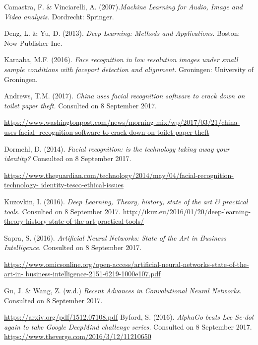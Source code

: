 \documentclass[12pt, titlepage]{article}
\begin{document}
		\begin{thebibliography}{99}
			Camastra, F. \& Vinciarelli, A. (2007).\textit{Machine Learning for Audio, Image and Video 				analysis.} Dordrecht: Springer.
			
			Deng, L. \& Yu, D. (2013). \textit{Deep Learning: Methods and Applications.} Boston: Now 				Publisher Inc.
			
			Karaaba, M.F. (2016). \textit{Face recognition in low resolution images under small sample 				conditions with facepart detection and alignment.} Groningen: University of Groningen.
			
			Andrews, T.M. (2017). \textit{China uses facial recognition software to crack down on toilet 			paper theft.} Consulted on 8 September 2017.
			
			\url{https://www.washingtonpost.com/news/morning-mix/wp/2017/03/21/china-uses-facial-					recognition-software-to-crack-down-on-toilet-paper-theft}
			
			Dormehl, D. (2014). \textit{Facial recognition: is the technology taking away your identity?} 			Consulted on 8 September 2017.
			
			\url{https://www.theguardian.com/technology/2014/may/04/facial-recognition-technology-					identity-tesco-ethical-issues}
			
			Kuzovkin, I. (2016). \textit{Deep Learning, Theory, history, state of the art \& practical 				tools.} Consulted on 8 September 2017.
			\url{http://ikuz.eu/2016/01/20/deep-learning-theory-history-state-of-the-art-practical-tools/}
			
			
			Sapra, S. (2016). \textit{Artificial Neural Networks: State of the Art in Business 						Intelligence.} Consulted on 8 September 2017.
			
			\url{https://www.omicsonline.org/open-access/artificial-neural-networks-state-of-the-art-in-			business-intelligence-2151-6219-1000e107.pdf}
			
			Gu, J. \& Wang, Z. (w.d.) \textit{Recent Advances in Convolutional Neural Networks.} Consulted 		on 8 September 2017.
			
			\url{https://arxiv.org/pdf/1512.07108.pdf}
			Byford, S. (2016). \textit{AlphaGo beats Lee Se-dol again to take Google DeepMind challenge 			series.} Consulted on 8 September 2017.
			\url{https://www.theverge.com/2016/3/12/11210650}
			

\end{thebibliography}
\end{document}
